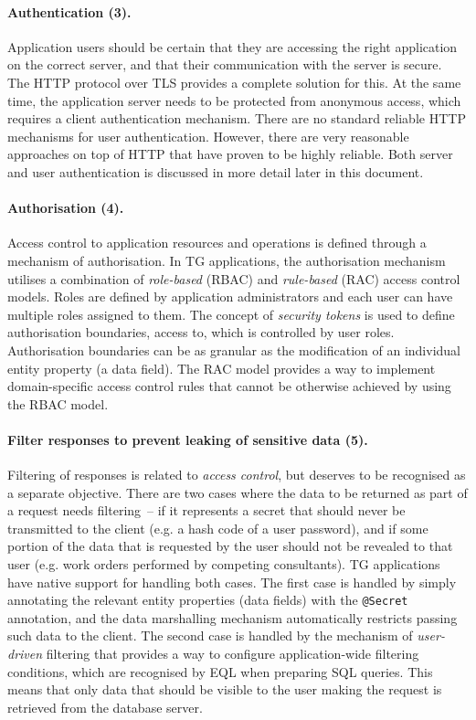 \documentclass[a4paper,12pt,oneside,openright]{memoir}
\begin{document}
	\paragraph{Authentication (3).}
		Application users should be certain that they are accessing the right application on the correct server, and that their communication with the server is secure.
		The HTTP protocol over TLS provides a complete solution for this.
		At the same time, the application server needs to be protected from anonymous access, which requires a client authentication mechanism.
		There are no standard reliable HTTP mechanisms for user authentication.
		However, there are very reasonable approaches on top of HTTP that have proven to be highly reliable.
		Both server and user authentication is discussed in more detail later in this document.

	\paragraph{Authorisation (4).}
		Access control to application resources and operations is defined through a mechanism of authorisation.
	  	In TG applications, the authorisation mechanism utilises a combination of \emph{role-based} (RBAC) and \emph{rule-based} (RAC) access control models.
		Roles are defined by application administrators and each user can have multiple roles assigned to them.
		The concept of \emph{security tokens} is used to define authorisation boundaries, access to, which is controlled by user roles.
		Authorisation boundaries can be as granular as the modification of an individual entity property (a data field).
		The RAC model provides a way to implement domain-specific access control rules that cannot be otherwise achieved by using the RBAC model.

	\paragraph{Filter responses to prevent leaking of sensitive data (5).}
		Filtering of responses is related to \emph{access control}, but deserves to be recognised as a separate objective.
		There are two cases where the data to be returned as part of a request needs filtering~-- if it represents a secret that should never be transmitted to the client (e.g. a hash code of a user password), and if some portion of the data that is requested by the user should not be revealed to that user (e.g. work orders performed by competing consultants).
		TG applications have native support for handling both cases.
		The first case is handled by simply annotating the relevant entity properties (data fields) with the \texttt{@Secret} annotation, and the data marshalling mechanism automatically restricts passing such data to the client.
		The second case is handled by the mechanism of \emph{user-driven} filtering that provides a way to configure application-wide filtering conditions, which are recognised by EQL when preparing SQL queries.
		This means that only data that should be visible to the user making the request is retrieved from the database server.
\end{document}
